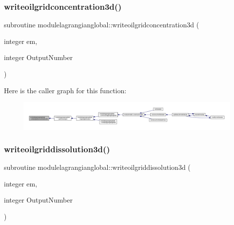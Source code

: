 \subsubsection{\texorpdfstring{writeoilgridconcentration3d()}{writeoilgridconcentration3d()}}
{\footnotesize\ttfamily subroutine modulelagrangianglobal\+::writeoilgridconcentration3d (\begin{DoxyParamCaption}\item[{integer}]{em,  }\item[{integer}]{Output\+Number }\end{DoxyParamCaption})\hspace{0.3cm}{\ttfamily [private]}}

Here is the caller graph for this function\+:\nopagebreak
\begin{figure}[H]
\begin{center}
\leavevmode
\includegraphics[width=350pt]{namespacemodulelagrangianglobal_ab2996daa63e4058df80e1dc7894c41af_icgraph}
\end{center}
\end{figure}
\mbox{\label{namespacemodulelagrangianglobal_ac2eff795bcd9d725896afa0d50c89794}} 
\subsubsection{\texorpdfstring{writeoilgriddissolution3d()}{writeoilgriddissolution3d()}}
{\footnotesize\ttfamily subroutine modulelagrangianglobal\+::writeoilgriddissolution3d (\begin{DoxyParamCaption}\item[{integer}]{em,  }\item[{integer}]{Output\+Number }\end{DoxyParamCaption})\hspace{0.3cm}{\ttfamily [private]}}

